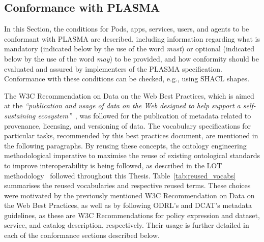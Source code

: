 \subsection{Conformance with PLASMA}
\label{sec:plasma_conformance}

In this Section, the conditions for Pods, apps, services, users, and agents to be conformant with PLASMA are described, including information regarding what is mandatory (indicated below by the use of the word \textit{must}) or optional (indicated below by the use of the word \textit{may}) to be provided, and how conformity should be evaluated and assured by implementers of the PLASMA specification.
Conformance with these conditions can be checked, e.g., using SHACL shapes.

The W3C Recommendation on Data on the Web Best Practices, which is aimed at the \textit{``publication and usage of data on the Web designed to help support a self-sustaining ecosystem''}~\citep{loscio_data_2017}, was followed for the publication of metadata related to provenance, licensing, and versioning of data.
The vocabulary specifications for particular tasks, recommended by this best practices document, are mentioned in the following paragraphs.
By reusing these concepts, the ontology engineering methodological imperative to maximise the reuse of existing ontological standards to improve interoperability is being followed, as described in the LOT methodology~\citep{poveda-villalon_lot_2022} followed throughout this Thesis.
Table~\ref{tab:reused_vocabs} summarises the reused vocabularies and respective reused terms.
These choices were motivated by the previously mentioned W3C Recommendation on Data on the Web Best Practices, as well as by following ODRL's and DCAT's metadata guidelines, as these are W3C Recommendations for policy expression and dataset, service, and catalog description, respectively.
Their usage is further detailed in each of the conformance sections described below.

